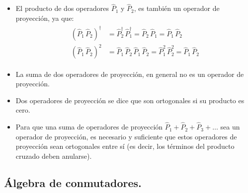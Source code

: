 \begin{itemize}
\item El producto de dos operadores $\hat{P}_{1}$ y $\hat{P}_{2}$, es también un operador de proyección, ya que:
\begin{align}
\begin{aligned}
(\hat{P}_{1} \, \hat{P}_{2})^{\dagger} &= \hat{P}_{2}^{\dagger} \, \hat{P}_{1}^{\dagger} = \hat{P}_{2} \, \hat{P}_{1} =  \hat{P}_{1} \, \hat{P}_{2} \\
(\hat{P}_{1} \, \hat{P}_{2})^{2} &= \hat{P}_{1} \, \hat{P}_{2} \, \hat{P}_{1} \, \hat{P}_{2} = \hat{P}_{1}^{2} \, \hat{P}_{2}^{2} = \hat{P}_{1} \, \hat{P}_{2}
\end{aligned}
\label{eq:ecuacion_02_77}
\end{align}
\item La suma de dos operadores de proyección, en general no es un operador de proyección.
\item Dos operadores de proyección se dice que son ortogonales si su producto es cero.
\item Para que una suma de operadores de proyección $\hat{P}_{1} + \hat{P}_{2} + \hat{P}_{3} + \ldots$ sea un operador de proyección, es necesario y suficiente que estos operadores de proyección sean ortogonales entre sí (es decir, los términos del producto cruzado deben anularse).
\end{itemize}

\subsection{Álgebra de conmutadores.}

